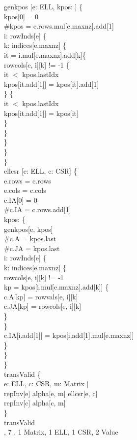 \begin{myquote}
\Bpred genkpos [e: ELL, kpos: \Bseqint] \{\\
\TA kpos[0] = 0\\
\TA \#kpos = e.rows.mul[e.maxnz].add[1]\\
\TA \Ball i: rowInds[e] \{\\
\TB \Ball k: indices[e.maxnz] \{\\
\TC \Blet it = i.mul[e.maxnz].add[k]\{\\
\TD rowcols[e, i][k] != -1 \Bimplies\{\\
\TE it $<$ kpos.lastIdx \Bimplies\\
\TF kpos[it.add[1]] = kpos[it].add[1]\\
\TD \} \Belse \{\\
\TE it $<$ kpos.lastIdx \Bimplies\\
\TF kpos[it.add[1]] = kpos[it]\\
\TD \}\\
\TC \}\\
\TB \}\\
\TA \}\\
\}\\
\Bpred ellcsr [e: ELL, c: CSR] \{\\
\TA e.rows = c.rows\\
\TA e.cols = c.cols\\
\TA c.IA[0] = 0\\
\TA \#c.IA = c.rows.add[1]\\
\TA \Bsome kpos: \Bseqint \{\\
\TB genkpos[e, kpos]\\
\TB \#c.A = kpos.last\\
\TB \#c.JA = kpos.last\\
\TB \Ball i: rowInds[e] \{\\
\TC \Ball k: indices[e.maxnz] \{\\
\TD rowcols[e, i][k] != -1 \Bimplies\\
\TD \Blet kp = kpos[i.mul[e.maxnz].add[k]] \{\\
\TE c.A[kp] = rowvals[e, i][k]\\
\TE c.JA[kp] = rowcols[e, i][k]\\
\TD \}\\
\TC \}\\
\TC c.IA[i.add[1]] = kpos[i.add[1].mul[e.maxnz]]\\
\TB \}\\
\TA \}\\
\}\\
\Bassert transValid \{\\
\TA \Ball e: ELL, c: CSR, m: Matrix $|$\\
\TB repInv[e] \Band alpha[e, m] \Band ellcsr[e, c] \Bimplies\\
\TC repInv[c] \Band alpha[c, m]\\
\}\\
\Bcheck transValid\\
\TA {} \Bint, 7 \Bseq, 1 Matrix, 1 ELL, 1 CSR, 2 Value\\
\end{myquote}